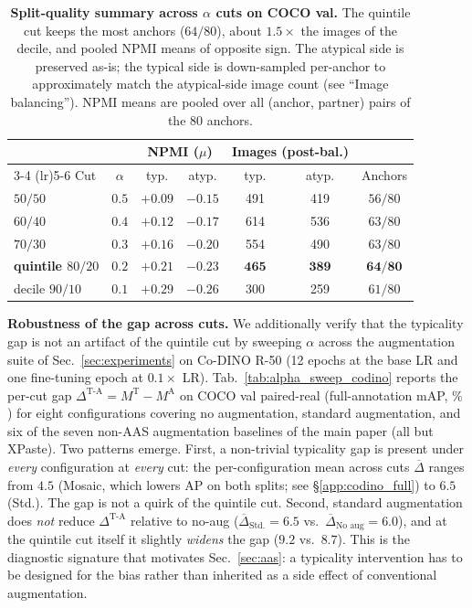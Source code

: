 \begin{table}[h]
\centering
\small
\caption{\textbf{Split-quality summary across $\alpha$ cuts on COCO val.} The quintile cut keeps the most anchors ($64/80$), about $1.5\times$ the images of the decile, and pooled NPMI means of opposite sign. The atypical side is preserved as-is; the typical side is down-sampled per-anchor to approximately match the atypical-side image count (see ``Image balancing''). NPMI means are pooled over all (anchor, partner) pairs of the $80$ anchors.}
\label{tab:alpha_split_quality}
\setlength{\tabcolsep}{4pt}
\begin{tabular}{l c cc cc c}
\toprule
& & \multicolumn{2}{c}{\textbf{NPMI ($\mu$)}} & \multicolumn{2}{c}{\textbf{Images (post-bal.)}} & \\
\cmidrule(lr){3-4} \cmidrule(lr){5-6}
Cut & $\alpha$ & typ. & atyp. & typ. & atyp. & Anchors \\
\midrule
$50/50$  & $0.5$ & $+0.09$ & $-0.15$ & 491 & 419 & $56/80$ \\
$60/40$  & $0.4$ & $+0.12$ & $-0.17$ & 614 & 536 & $63/80$ \\
$70/30$  & $0.3$ & $+0.16$ & $-0.20$ & 554 & 490 & $63/80$ \\
\textbf{quintile $80/20$} & $\boldsymbol{0.2}$ & $\boldsymbol{+0.21}$ & $\boldsymbol{-0.23}$ & $\boldsymbol{465}$ & $\boldsymbol{389}$ & $\boldsymbol{64/80}$ \\
decile $90/10$    & $0.1$ & $+0.29$ & $-0.26$ & 300 & 259 & $61/80$ \\
\bottomrule
\end{tabular}
\end{table}

%

\noindent\textbf{Robustness of the gap across cuts.}
We additionally verify that the typicality gap is not an artifact of the quintile cut by sweeping $\alpha$ across the augmentation suite of Sec.~\ref{sec:experiments} on Co-DINO R-50 (12 epochs at the base LR and one fine-tuning epoch at $0.1\times$ LR). Tab.~\ref{tab:alpha_sweep_codino} reports the per-cut gap $\Delta^{\text{T-A}} = M^{\text{T}} - M^{\text{A}}$ on COCO val paired-real (full-annotation mAP, $\%$) for eight configurations covering no augmentation, standard augmentation, and six of the seven non-AAS augmentation baselines of the main paper (all but XPaste). Two patterns emerge. First, a non-trivial typicality gap is present under \emph{every} configuration at \emph{every} cut: the per-configuration mean across cuts $\overline{\Delta}$ ranges from $4.5$ (Mosaic, which lowers AP on both splits; see \S\ref{app:codino_full}) to $6.5$ (Std.). The gap is not a quirk of the quintile cut. Second, standard augmentation does \emph{not} reduce $\Delta^{\text{T-A}}$ relative to no-aug ($\overline{\Delta}_{\text{Std.}} = 6.5$ vs.\ $\overline{\Delta}_{\text{No aug}} = 6.0$), and at the quintile cut itself it slightly \emph{widens} the gap ($9.2$ vs.\ $8.7$). This is the diagnostic signature that motivates Sec.~\ref{sec:aas}: a typicality intervention has to be designed for the bias rather than inherited as a side effect of conventional augmentation.

